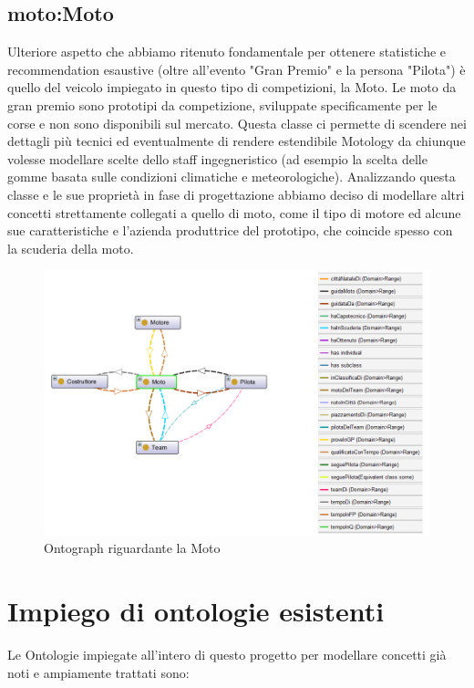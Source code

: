 \subsection{moto:Moto}
Ulteriore aspetto che abbiamo ritenuto fondamentale per ottenere statistiche e recommendation esaustive (oltre all'evento "Gran Premio" e la persona "Pilota") è quello del veicolo impiegato in questo tipo di competizioni, la Moto. Le moto da gran premio sono prototipi da competizione, sviluppate specificamente per le corse e non sono disponibili sul mercato. Questa classe ci permette di scendere nei dettagli più tecnici ed eventualmente di rendere estendibile Motology da chiunque volesse modellare scelte dello staff ingegneristico (ad esempio la scelta delle gomme basata sulle condizioni climatiche e meteorologiche). Analizzando questa classe e le sue proprietà in fase di progettazione abbiamo deciso di modellare altri concetti strettamente collegati a quello di moto, come il tipo di motore ed alcune sue caratteristiche e l'azienda produttrice del prototipo, che coincide spesso con la scuderia della moto.
    
\begin{figure}[H]
    \begin{center}
        \includegraphics[scale=0.8]{img/moto.png}
       \caption{Ontograph riguardante la Moto} 
    \end{center}
\end{figure}

\newpage

\section{Impiego di ontologie esistenti}
Le Ontologie impiegate all'intero di questo progetto per modellare concetti già noti e ampiamente trattati sono:

